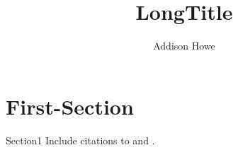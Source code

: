 \documentclass[aspectratio=169,xcolor=svgnames]{beamer}
\title[shorttitle]{LongTitle}
\subtitle{}
\author[Howe]{Addison Howe}
\date{}
\begin{document}
\inserttitleframe{}
\inserttableofcontents{}


\section{First-Section}

\begin{frame}{Section1}
    Include citations to \cite{placeholder-ref1} and \cite{placeholder-ref2}.
\end{frame}



\insertreferences{}
\end{document}
